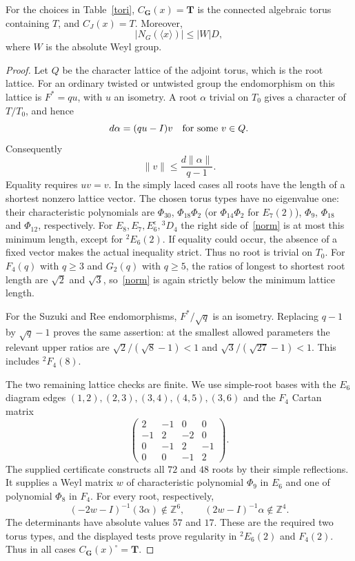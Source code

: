 \documentclass[10pt,a4paper]{article}
\begin{document}
\begin{lemma}\label{regular}
For the choices in Table~\ref{tori},
$C_{\mathbf G}(x)=\mathbf T$ is the connected algebraic torus containing
$T$, and $C_J(x)=T$. Moreover,
\begin{equation}\label{normalizer}
 |N_G(\langle x\rangle)|\le |W|D,
\end{equation}
where $W$ is the absolute Weyl group.
\end{lemma}
\begin{proof}
Let $Q$ be the character lattice of the adjoint torus, which is the root
lattice. For an ordinary twisted or untwisted group the endomorphism on
this lattice is $F^*=qu$, with $u$ an isometry. A root $\alpha$ trivial on
$T_0$ gives a character of $T/T_0$, and hence
\[
 d\alpha=(qu-I)v\quad\hbox{for some }v\in Q.
\]
Consequently
\begin{equation}\label{norm}
 \|v\|\le\frac{d\|\alpha\|}{q-1}.
\end{equation}
Equality requires $uv=v$. In the simply laced cases all roots have the
length of a shortest nonzero lattice vector. The chosen torus types have
no eigenvalue one: their characteristic polynomials are
$\Phi_{30}$, $\Phi_{18}\Phi_2$ (or $\Phi_{14}\Phi_2$ for $E_7(2)$),
$\Phi_9$, $\Phi_{18}$ and $\Phi_{12}$, respectively.
For $E_8,E_7,E_6^\epsilon,{}^3D_4$ the right side
of~\eqref{norm} is at most this minimum length, except for ${}^2E_6(2)$.
If equality could occur, the absence of a fixed vector makes the actual
inequality strict. Thus no root is trivial on $T_0$.
For $F_4(q)$ with $q\ge3$ and $G_2(q)$ with $q\ge5$, the ratios of longest
to shortest root length are $\sqrt2$ and $\sqrt3$, so~\eqref{norm}
is again strictly below the minimum lattice length.

For the Suzuki and Ree endomorphisms, $F^*/\sqrt q$ is an isometry.
Replacing $q-1$ by $\sqrt q-1$ proves the same assertion:
at the smallest allowed parameters the relevant upper ratios are
$\sqrt2/(\sqrt8-1)<1$ and $\sqrt3/(\sqrt{27}-1)<1$.
This includes ${}^2F_4(8)$.

The two remaining lattice checks are finite. We use simple-root bases
with the $E_6$ diagram edges
$(1,2),(2,3),(3,4),(4,5),(3,6)$ and the $F_4$ Cartan matrix
\[
 \begin{pmatrix}2&-1&0&0\\-1&2&-2&0\\0&-1&2&-1\\0&0&-1&2\end{pmatrix}.
\]
The supplied certificate constructs all $72$ and $48$ roots by their
simple reflections. It supplies a Weyl matrix $w$ of characteristic
polynomial $\Phi_9$ in $E_6$ and one of polynomial $\Phi_8$ in $F_4$.
For every root, respectively,
\[
 (-2w-I)^{-1}(3\alpha)\notin\mathbb Z^6,
 \qquad (2w-I)^{-1}\alpha\notin\mathbb Z^4.
\]
The determinants have absolute values $57$ and $17$. These are the
required two torus types, and the displayed tests prove regularity in
${}^2E_6(2)$ and $F_4(2)$. Thus in all cases
$C_{\mathbf G}(x)^\circ=\mathbf T$.


\end{proof}
\end{document}
